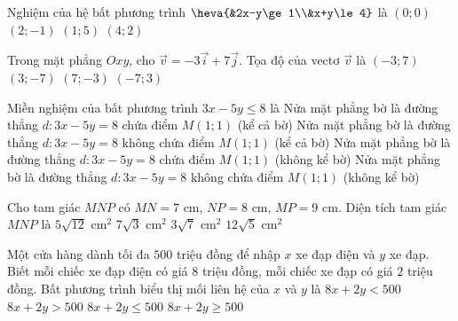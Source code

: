 \begin{ex}%
	Nghiệm của hệ bất phương trình $\heva{&2x-y\ge 1\\&x+y\le 4}$ là
	\choice
		{$(0;0)$}
		{\True $(2;-1)$}
		{$(1;5)$}
		{$(4;2)$}
\end{ex}

\begin{ex}%
	Trong mặt phẳng $Oxy$, cho $\vec{v}=-3\vec{i}+7\vec{j}$. Tọa độ của vectơ $\vec{v}$ là
	\choice
		{\True $(-3;7)$}
		{$(3;-7)$}
		{$(7;-3)$}
		{$(-7;3)$}
\end{ex}

\begin{ex}%
	Miền nghiệm của bất phương trình $3x-5y\le 8$ là
	\choice
		{\True Nửa mặt phẳng bờ là đường thẳng $d\colon 3x-5y=8$ chứa điểm $M(1;1)$ (kể cả bờ)}
		{Nửa mặt phẳng bờ là đường thẳng $d\colon 3x-5y=8$ không chứa điểm $M(1;1)$ (kể cả bờ)}
		{Nửa mặt phẳng bờ là đường thẳng $d\colon 3x-5y=8$ chứa điểm $M(1;1)$ (không kể bờ)}
		{Nửa mặt phẳng bờ là đường thẳng $d\colon 3x-5y=8$ không chứa điểm $M(1;1)$ (không kể bờ)}
\end{ex}

\begin{ex}%
	Cho tam giác $MNP$ có $MN=7\text{ cm}$, $NP=8\text{ cm}$, $MP=9\text{ cm}$. Diện tích tam giác $MNP$ là
	\choice
		{$5\sqrt{12}\text{ cm}^2$}
		{$7\sqrt{3}\text{ cm}^2$}
		{$3\sqrt{7}\text{ cm}^2$}
		{\True $12\sqrt{5}\text{ cm}^2$}
\end{ex}

\begin{ex}%
	Một cửa hàng dành tối đa $500$ triệu đồng để nhập $x$ xe đạp điện và $y$ xe đạp. Biết mỗi chiếc xe đạp điện có giá $8$ triệu đồng, mỗi chiếc xe đạp có giá $2$ triệu đồng. Bất phương trình biểu thị mối liên hệ của $x$ và $y$ là
	\choice
		{$8x+2y<500$}
		{$8x+2y>500$}
		{\True $8x+2y\le 500$}
		{$8x+2y\ge 500$}
\end{ex}

